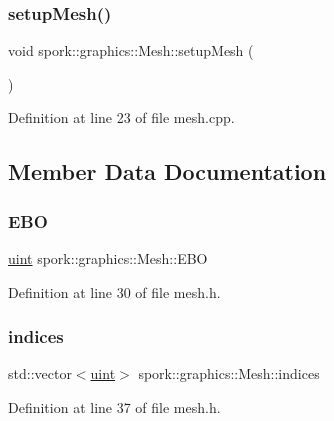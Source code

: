 \subsubsection{\texorpdfstring{setup\+Mesh()}{setupMesh()}}
{\footnotesize\ttfamily void spork\+::graphics\+::\+Mesh\+::setup\+Mesh (\begin{DoxyParamCaption}{ }\end{DoxyParamCaption})}



Definition at line 23 of file mesh.\+cpp.



\subsection{Member Data Documentation}
\mbox{\label{classspork_1_1graphics_1_1_mesh_a96fbfb27eb4482b87b48e77567df41f7}} 
\subsubsection{\texorpdfstring{E\+BO}{EBO}}
{\footnotesize\ttfamily \hyperlink{defines_8h_a91ad9478d81a7aaf2593e8d9c3d06a14}{uint} spork\+::graphics\+::\+Mesh\+::\+E\+BO\hspace{0.3cm}{\ttfamily [private]}}



Definition at line 30 of file mesh.\+h.

\mbox{\label{classspork_1_1graphics_1_1_mesh_aaf3d3748786e2faff3cee404497853ff}} 
\subsubsection{\texorpdfstring{indices}{indices}}
{\footnotesize\ttfamily std\+::vector$<$\hyperlink{defines_8h_a91ad9478d81a7aaf2593e8d9c3d06a14}{uint}$>$ spork\+::graphics\+::\+Mesh\+::indices}



Definition at line 37 of file mesh.\+h.

\mbox{\label{classspork_1_1graphics_1_1_mesh_a2bfa767192b6622231e3aeeeea9ba119}} 
